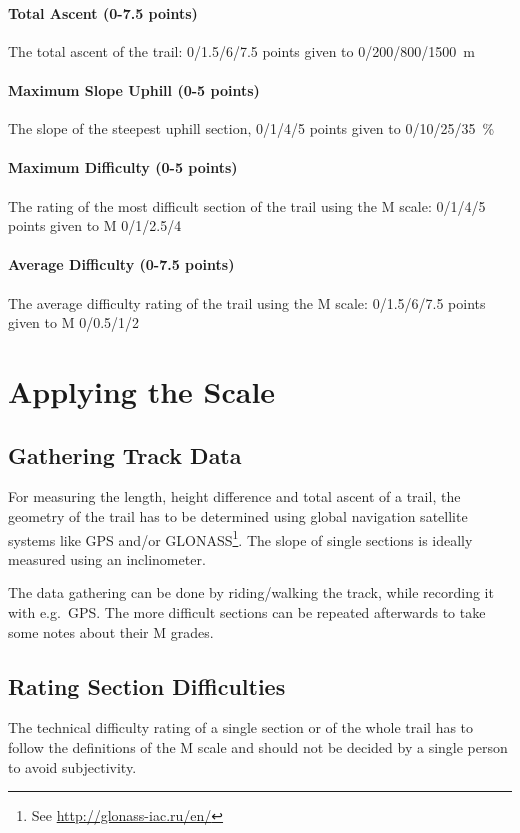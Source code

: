 \documentclass[a4paper,oneside]{scrartcl}
\begin{document}
\paragraph{Total Ascent (0-7.5 points)} 
\hangindent=1cm
The total ascent of the trail: 0/1.5/6/7.5 points given to 0/200/800/1500~m

\paragraph{Maximum Slope Uphill (0-5 points)} 
\hangindent=1cm
The slope of the steepest uphill section, 0/1/4/5 points given to 0/10/25/35~\%

\paragraph{Maximum Difficulty (0-5 points)}
\hangindent=1cm
The rating of the most difficult section of the trail using the M scale: 0/1/4/5
points given to M 0/1/2.5/4

\paragraph{Average Difficulty (0-7.5 points)} 
\hangindent=1cm
The average difficulty rating of the trail using the M scale: 0/1.5/6/7.5 points
given to M 0/0.5/1/2





\section{Applying the Scale}

\subsection{Gathering Track Data}
For measuring the length, height difference and total ascent of a trail, the
geometry of the trail has to be determined using global navigation satellite
systems like GPS and/or GLONASS\footnote{See \url{http://glonass-iac.ru/en/}}.
The slope of single sections is ideally measured using an inclinometer.

The data gathering can be done by riding/walking the track, while recording it
with e.g.\ GPS. The more difficult sections can be repeated afterwards to take
some notes about their M grades.

\subsection{Rating Section Difficulties}
The technical difficulty rating of a single section or of the whole trail has to
follow the definitions of the M scale and should not be decided by a single
person to avoid subjectivity.
\end{document}
